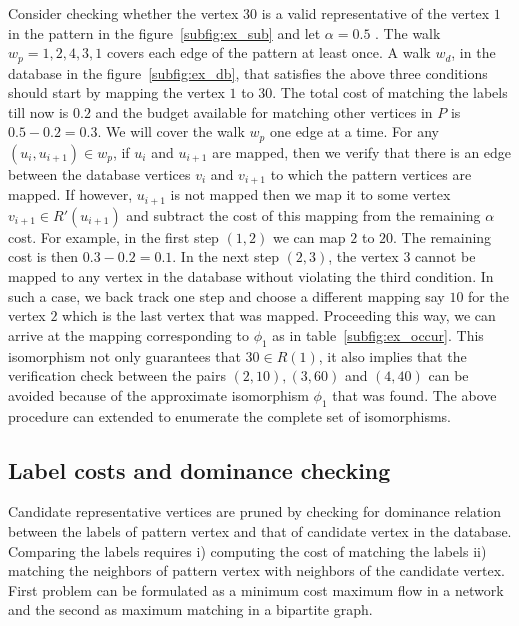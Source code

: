 Consider checking whether the vertex $30$ is a valid representative of the vertex
$1$ in the pattern in the figure~\ref{subfig:ex_sub} and let $\alpha = 0.5$ . The
walk $ w_p = 1, 2, 4, 3, 1$ covers each edge of the pattern at least once. A
walk $w_d$, in the database in the figure~\ref{subfig:ex_db}, 
that satisfies the above three conditions should start by mapping the
vertex $1$ to $30$. The total cost of matching the labels till now is $0.2$ and
the budget available for matching other vertices in $P$ is $0.5 - 0.2 = 0.3$.
We will cover the walk $w_p$ one edge at a time. For any $(u_i, u_{i+1}) \in
w_p$, if $u_i$ and $u_{i+1}$ are mapped, then we verify that there is an edge
between the database vertices $v_i$ and $v_{i+1}$ to which the pattern vertices
are mapped.  If however, $u_{i+1}$ is not mapped then we map it to some vertex
$v_{i+1} \in R'(u_{i+1})$ and subtract the cost of this mapping from the
remaining $\alpha$ cost.  For example, in the first step $(1,2)$ we can map $2$ to $20$.
The remaining cost is then $0.3 - 0.2 = 0.1$. In the next step $(2,3)$, the
vertex $3$ cannot be mapped to any vertex in the database without violating the
third condition.  In such a case, we back track one step and choose a different
mapping say $10$ for the vertex $2$ which is the last vertex that was mapped.
Proceeding this way, we can arrive at the mapping corresponding to $\phi_{1}$ as
in table~\ref{subfig:ex_occur}.  This isomorphism not only guarantees that $30
\in R(1)$, it also implies that the verification check between the pairs $(2,
10), (3, 60)$ and $(4, 40)$ can be avoided because of the approximate isomorphism
$\phi_1$ that was found.  The above procedure can extended to enumerate the
complete set of isomorphisms.



\subsection{Label costs and dominance checking} \label{sec:labelcheck} 
Candidate representative vertices are pruned by checking for dominance 
relation between the \ncl labels of pattern vertex and that of candidate
vertex in the database. Comparing the \ncl labels requires i) computing the
cost of matching the \khop labels ii) matching the neighbors of pattern vertex 
with neighbors of the candidate vertex. First problem can be formulated
as a minimum cost maximum flow in a network and the second as maximum matching
in a bipartite graph.

